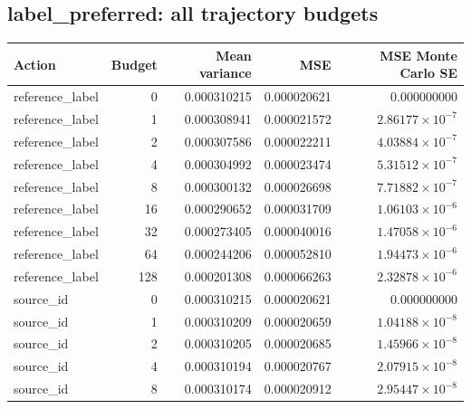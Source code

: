 \reservetable
\subsection{label\_preferred: all trajectory budgets}

\begingroup\small
\setlength{\tabcolsep}{4pt}
\begin{longtable}{lrrrr}
\toprule

Action & Budget & Mean variance & MSE & MSE Monte Carlo SE\\\midrule\endhead

reference\_label & 0 & 0.000310215 & 0.000020621 & 0.000000000\\

reference\_label & 1 & 0.000308941 & 0.000021572 & $2.86177\times10^{-7}$\\

reference\_label & 2 & 0.000307586 & 0.000022211 & $4.03884\times10^{-7}$\\

reference\_label & 4 & 0.000304992 & 0.000023474 & $5.31512\times10^{-7}$\\

reference\_label & 8 & 0.000300132 & 0.000026698 & $7.71882\times10^{-7}$\\

reference\_label & 16 & 0.000290652 & 0.000031709 & $1.06103\times10^{-6}$\\

reference\_label & 32 & 0.000273405 & 0.000040016 & $1.47058\times10^{-6}$\\

reference\_label & 64 & 0.000244206 & 0.000052810 & $1.94473\times10^{-6}$\\

reference\_label & 128 & 0.000201308 & 0.000066263 & $2.32878\times10^{-6}$\\

source\_id & 0 & 0.000310215 & 0.000020621 & 0.000000000\\

source\_id & 1 & 0.000310209 & 0.000020659 & $1.04188\times10^{-8}$\\

source\_id & 2 & 0.000310205 & 0.000020685 & $1.45966\times10^{-8}$\\

source\_id & 4 & 0.000310194 & 0.000020767 & $2.07915\times10^{-8}$\\

source\_id & 8 & 0.000310174 & 0.000020912 & $2.95447\times10^{-8}$\\


\end{longtable}

